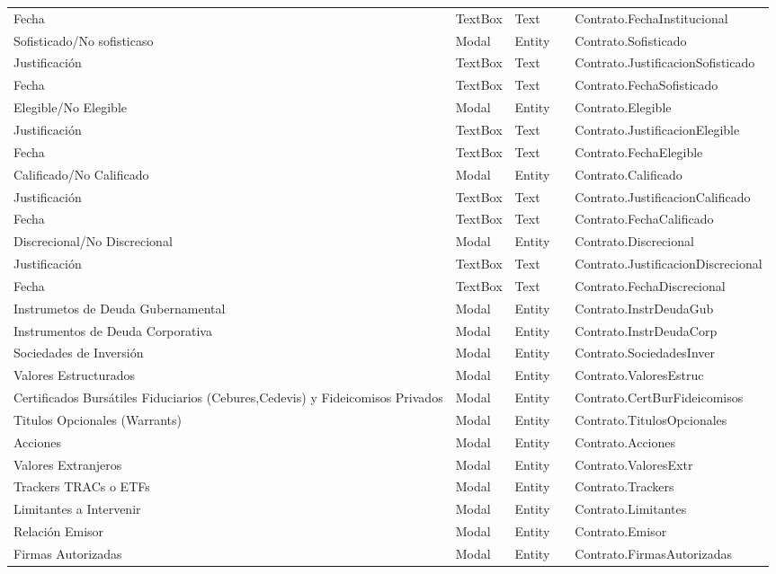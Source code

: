 \begin{table}[H]
{\begin{tabular}{ p{4cm} p{2cm} p{2cm} p{3cm} p{8cm} }
		Fecha &
		TextBox &
		Text &
		 &
		Contrato.FechaInstitucional \\
		Sofisticado/No sofisticaso &
		Modal &
		Entity &
		 &
		Contrato.Sofisticado \\
		Justificaci\'on &
		TextBox &
		Text &
		 &
		Contrato.JustificacionSofisticado \\
		Fecha &
		TextBox &
		Text &
		 &
		Contrato.FechaSofisticado \\
		Elegible/No Elegible &
		Modal &
		Entity &
		 &
		Contrato.Elegible \\
		Justificaci\'on &
		TextBox &
		Text &
		 &
		Contrato.JustificacionElegible \\
		Fecha &
		TextBox &
		Text &
		 &
		Contrato.FechaElegible \\
		Calificado/No Calificado &
		Modal &
		Entity &
		 &
		Contrato.Calificado \\
		Justificaci\'on &
		TextBox &
		Text &
		 &
		Contrato.JustificacionCalificado \\
		Fecha &
		TextBox &
		Text &
		 &
		Contrato.FechaCalificado \\
		Discrecional/No Discrecional &
		Modal &
		Entity &
		 &
		Contrato.Discrecional \\
		Justificaci\'on &
		TextBox &
		Text &
		 &
		Contrato.JustificacionDiscrecional \\
		Fecha &
		TextBox &
		Text &
		 &
		Contrato.FechaDiscrecional \\
		Instrumetos de Deuda Gubernamental &
		Modal &
		Entity &
		 &
		Contrato.InstrDeudaGub \\
		Instrumentos de Deuda Corporativa &
		Modal &
		Entity &
		 &
		Contrato.InstrDeudaCorp \\
		Sociedades de Inversi\'on &
		Modal &
		Entity &
		 &
		Contrato.SociedadesInver \\
		Valores Estructurados &
		Modal &
		Entity &
		 &
		Contrato.ValoresEstruc \\
		Certificados Burs\'atiles Fiduciarios (Cebures,Cedevis) y Fideicomisos Privados &
		Modal &
		Entity &
		 &
		Contrato.CertBurFideicomisos \\
		Titulos Opcionales (Warrants) &
		Modal &
		Entity &
		 &
		Contrato.TitulosOpcionales \\
		Acciones &
		Modal &
		Entity &
		 &
		Contrato.Acciones \\
		Valores Extranjeros &
		Modal &
		Entity &
		 &
		Contrato.ValoresExtr \\
		Trackers TRACs o ETFs &
		Modal &
		Entity &
		 &
		Contrato.Trackers \\
		Limitantes a Intervenir &
		Modal &
		Entity &
		 &
		Contrato.Limitantes \\
		Relaci\'on Emisor &
		Modal &
		Entity &
		 &
		Contrato.Emisor \\
		Firmas Autorizadas &
		Modal &
		Entity &
		 &
		Contrato.FirmasAutorizadas \\
		\hline
	\end{tabular}
	}
\end{table}

